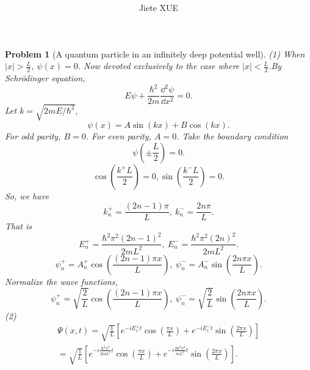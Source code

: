 \documentclass{article}
\title{\textbf{\mytitle}}
\author{Jiete XUE}
\date{\mydate}
\theoremstyle{1}
\newtheorem{problem}{Problem}
\begin{document}
\maketitle
\begin{problem}[A quantum particle in an infinitely deep potential well]
    (1) When $\left| x\right|>\frac{L}{2}$, $\psi(x)=0$. Now devoted exclusively to the case where $\left| x\right|<\frac{L}{2}$.By Schrödinger equation,
    \begin{equation}
       E\psi+\frac{\hbar^2}{2m}\frac{\dd^2 \psi}{\dd x^2}=0.
    \end{equation}
    Let $k=\sqrt{2mE/\hbar^2}$,
    \begin{equation}
        \psi(x)=A\sin(kx)+B\cos(kx).
    \end{equation}
    For odd parity, $B=0$. For even parity, $A=0$.
    Take the boundary condition
    \begin{equation}
        \psi(\pm \frac{L}{2})=0.
    \end{equation}
    \begin{equation}
        \cos(\frac{k^+L}{2})=0,\sin(\frac{k^-L}{2})=0.
    \end{equation}
    So, we have
    \begin{equation}
        k_n^+=\frac{\left(2n-1\right)\pi}{L},\ k_n^-=\frac{2n\pi}{L}.
    \end{equation}
    That is 
    \begin{equation}
        \boxed{E_n^+=\frac{\hbar^2 \pi^2(2n-1)^2}{2mL^2},\ E_n^-=\frac{\hbar^2 \pi^2 (2n)^2}{2mL^2}.}
    \end{equation}
    \begin{equation}
        \psi_n^+=A_n^+\cos\left(\frac{\left(2n-1\right)\pi x}{L}\right),\ \psi_n^-=A_n^-\sin\left(\frac{2n\pi x}{L}\right).
    \end{equation}
    Normalize the wave functions,
    \begin{equation}
       \boxed{ \psi_n^+=\sqrt{\frac{2}{L}}\cos\left(\frac{\left(2n-1\right)\pi x}{L}\right),\ \psi_n^-=\sqrt{\frac{2}{L}}\sin\left(\frac{2n\pi x}{L}\right)}.
    \end{equation}
    (2) \begin{eqnarray}
        \Psi(x,t)=\sqrt{\frac{1}{L}}\left[e^{-iE_1^+t}\cos(\frac{\pi x}{L})+e^{-iE_1^-t}\sin(\frac{2\pi x}{L})\right]\\
        =\boxed{\sqrt{\frac{1}{L}}\left[e^{-i \frac{\hbar^2 \pi^2}{2mL^2}t}\cos(\frac{\pi x}{L})+e^{-i \frac{2\hbar^2 \pi^2 }{mL^2}t}\sin(\frac{2\pi x}{L})\right]}.

\end{eqnarray}
\end{problem}
\end{document}
